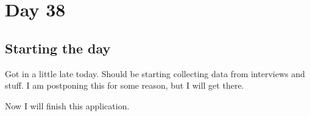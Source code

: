 \section{Day 38}
\subsection{Starting the day}
Got in a little late today.
Should be starting collecting data from interviews and stuff.
I am postponing this for some reason, but I will get there.

Now I will finish this application.
